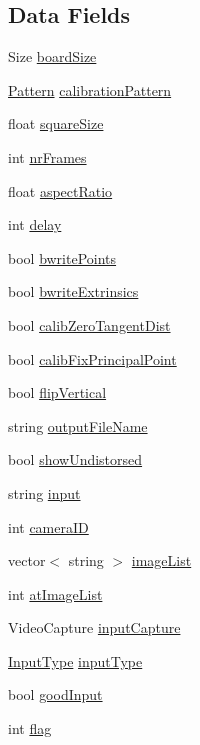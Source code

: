 \subsection*{Data Fields}
\begin{DoxyCompactItemize}
\item 
Size \hyperlink{classSettings_a5030a7164df923bb3b86dd7a0fc9af30}{boardSize}
\item 
\hyperlink{classSettings_a0e7117abd9427a6f8bc1d1d8d456b5c8}{Pattern} \hyperlink{classSettings_a94551b7ffe8ac60311b035b2905e9498}{calibrationPattern}
\item 
float \hyperlink{classSettings_a6c94708776ad1ce258fc44f2101f5941}{squareSize}
\item 
int \hyperlink{classSettings_a7e6654cd0e51791ed687eaa85f8fc143}{nrFrames}
\item 
float \hyperlink{classSettings_af55c910308a0d773055d0b19261bb3b8}{aspectRatio}
\item 
int \hyperlink{classSettings_a5fe947366441009187d633f9e4663256}{delay}
\item 
bool \hyperlink{classSettings_ab4aac97bdb5696d60b35a29c26497064}{bwritePoints}
\item 
bool \hyperlink{classSettings_af1ac412d660e25aea698c76fa88de57c}{bwriteExtrinsics}
\item 
bool \hyperlink{classSettings_a4bc7ff147d74721a3587ce6fcb64ef32}{calibZeroTangentDist}
\item 
bool \hyperlink{classSettings_a44397eea3f08a0c78808c38bdd716594}{calibFixPrincipalPoint}
\item 
bool \hyperlink{classSettings_ab6304f260b315d2820f755e1c3a052b5}{flipVertical}
\item 
string \hyperlink{classSettings_a9468f1ad53e982f9541d76c8d3228900}{outputFileName}
\item 
bool \hyperlink{classSettings_a935d6f27ee454e9fee63f8b662f48a06}{showUndistorsed}
\item 
string \hyperlink{classSettings_a9970d51ab47b6560ab11b267637b6219}{input}
\item 
int \hyperlink{classSettings_af32a5ff06192bde106c934e0361bcd7e}{cameraID}
\item 
vector$<$ string $>$ \hyperlink{classSettings_ae261128a69d1d3d2b0f5315aff8066c8}{imageList}
\item 
int \hyperlink{classSettings_a80061aedf354e63cb6c4c1fb7c4a9055}{atImageList}
\item 
VideoCapture \hyperlink{classSettings_abd5706146b34d3c32aef4025dcd2ec1b}{inputCapture}
\item 
\hyperlink{classSettings_a5afe85d24b071973a7f248c05386f7f4}{InputType} \hyperlink{classSettings_a89fb14ce9856fb642f18bb0f7c5b8868}{inputType}
\item 
bool \hyperlink{classSettings_a3b9fc27b555f982bd5b9ea5198e1f7e3}{goodInput}
\item 
int \hyperlink{classSettings_aba5691e3e76525f93ea254e654ec3717}{flag}
\end{DoxyCompactItemize}


